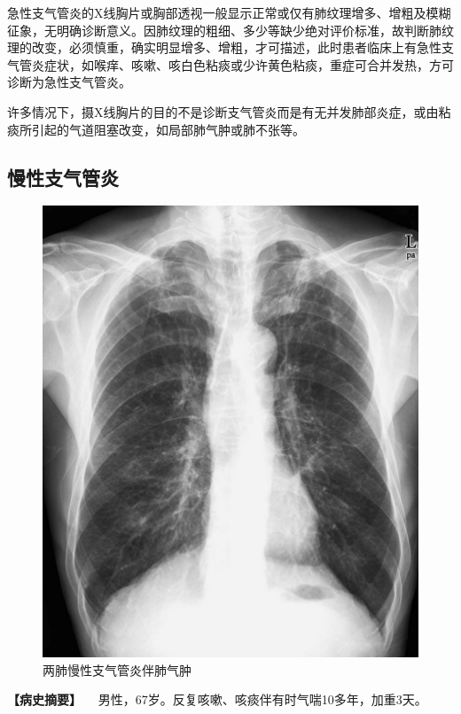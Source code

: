 急性支气管炎的X线胸片或胸部透视一般显示正常或仅有肺纹理增多、增粗及模糊征象，无明确诊断意义。因肺纹理的粗细、多少等缺少绝对评价标准，故判断肺纹理的改变，必须慎重，确实明显增多、增粗，才可描述，此时患者临床上有急性支气管炎症状，如喉痒、咳嗽、咳白色粘痰或少许黄色粘痰，重症可合并发热，方可诊断为急性支气管炎。

许多情况下，摄X线胸片的目的不是诊断支气管炎而是有无并发肺部炎症，或由粘痰所引起的气道阻塞改变，如局部肺气肿或肺不张等。

\subsection{慢性支气管炎}

\begin{figure}[!htbp]
 \centering
 \includegraphics{./images/Image00140.jpg}
 \captionsetup{justification=centering}
 \caption{两肺慢性支气管炎伴肺气肿}
 \label{fig3-2-4}
  \end{figure} 

\textbf{【病史摘要】}
　男性，67岁。反复咳嗽、咳痰伴有时气喘10多年，加重3天。


